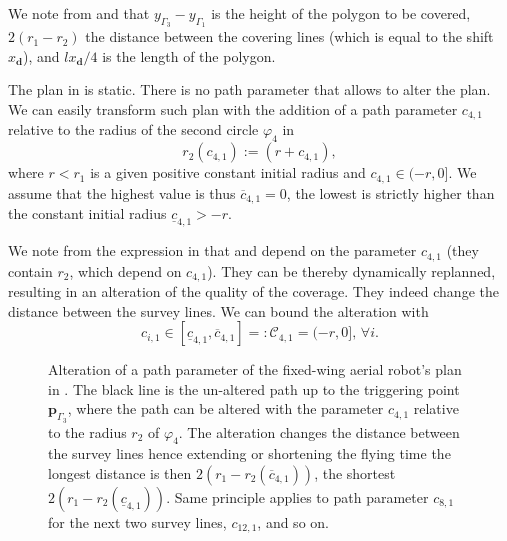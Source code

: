 We note from  and  that $y_{\Gamma_3}-y_{\Gamma_1}$ is the height of the polygon to be covered, $2(r_1-r_2)$ the distance between the covering lines (which is equal to the shift $x_\mathbf{d}$), and $lx_\mathbf{d}/4$ is the length of the polygon.

The plan in  is static. There is no path parameter that allows to alter the plan. We can easily transform such plan with the addition of a path parameter $c_{4,1}$ relative to the radius of the second circle $\varphi_4$ in 
\begin{equation}\label{eq:radius-dynamic}
  r_2(c_{4,1}):=(r+c_{4,1}),
\end{equation}
where $r<r_1$ is a given positive constant initial radius and $c_{4,1}\in(-r,0]$. We assume that the highest value is thus $\overline{c}_{4,1}=0$, the lowest is strictly higher than the constant initial radius $\underline{c}_{4,1}>-r$.

We note from the expression in  that  and  depend on the parameter $c_{4,1}$ (they contain $r_2$, which depend on $c_{4,1}$). They can be thereby dynamically replanned, resulting in an alteration of the quality of the coverage. They indeed change the distance between the survey lines.
We can bound the alteration with 
\begin{equation}\label{eq:path-const-c}
  c_{i,1}\in[\underline{c}_{4,1},\overline{c}_{4,1}]=:\mathcal{C}_{4,1}=(-r,0],\,\forall i.
\end{equation} 

\begin{figure}[p!]
  \centering
  
  \caption[Alteration of a path parameter of the fixed-wing aerial robot's plan]{Alteration of a path parameter of the fixed-wing aerial robot's plan in . The black line is the un-altered path up to the triggering point $\mathbf{p}_{\Gamma_3}$, where the path can be altered with the parameter $c_{4,1}$ relative to the radius $r_2$ of $\varphi_4$. The alteration changes the distance between the survey lines hence extending or shortening the flying time the longest distance is then $2(r_1-r_2(\overline{c}_{4,1}))$, the shortest $2(r_1-r_2(\underline{c}_{4,1}))$. Same principle applies to path parameter $c_{8,1}$ for the next two survey lines, $c_{12,1}$, and so on.}
  \label{fig:plot5}
\end{figure}

